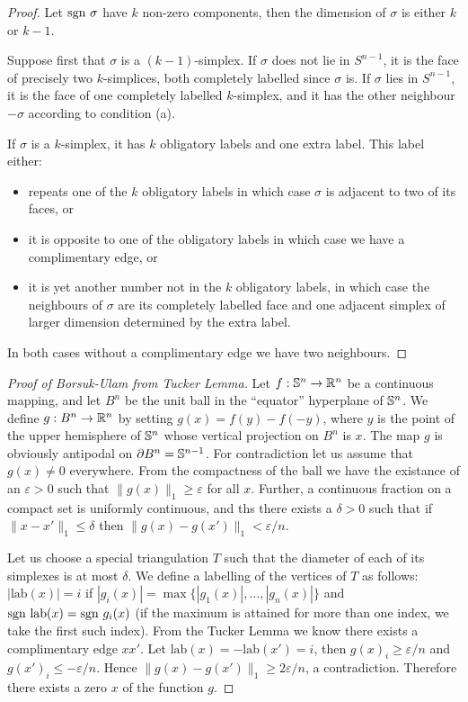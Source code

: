 \begin{proof}
    Let $\text{sgn } \sigma$ have $k$ non-zero components, then the dimension of $\sigma$ is either $k$ or $k-1$. 

    Suppose first that $\sigma$ is a $(k-1)$-simplex. If $\sigma$ does not lie in $S^{n-1}$, it is the face of precisely two $k$-simplices, both completely labelled since $\sigma$ is.  If $\sigma$ lies in $S^{n-1}$, it is the face of one completely labelled $k$-simplex, and it has the other neighbour $-\sigma$ according to condition (a).

    If $\sigma$ is a $k$-simplex, it has $k$ obligatory labels and one extra label. This label either:
    \begin{itemize}
        \item repeats one of the $k$ obligatory labels in which case $\sigma$ is adjacent to two of its faces, or
        \item it is opposite to one of the obligatory labels in which case we have a complimentary edge, or \item it is yet another number not in the $k$ obligatory labels, in which case the neighbours of $\sigma$ are its completely labelled face and one adjacent simplex of larger dimension determined by the extra label. 
    \end{itemize}
    In both cases without a complimentary edge we have two neighbours.
\end{proof}

\begin{proof}[Proof of Borsuk-Ulam from Tucker Lemma]
    Let $f: \mathbb S^n \to \mathbb R^n$ be a continuous mapping, and let $B^n$ be the unit ball in the ``equator'' hyperplane of $\mathbb S^n$. We define $g: B^n \to \mathbb R^n$ by setting $g(x) = f(y) - f(-y)$, where $y$ is the point of the upper hemisphere of $\mathbb S^n$ whose vertical projection on $B^n$ is $x$. The map $g$ is obviously antipodal on $\partial B^n = \mathbb S^{n-1}$. For contradiction let us assume that $g(x) \neq 0$ everywhere. From the compactness of the ball we have the existance of an $\varepsilon > 0$ such that $\|g(x)\|_1 \geq \varepsilon$ for all $x$. Further, a continuous fraction on a compact set is uniformly continuous, and ths there exists a $\delta > 0$ such that if $\| x - x' \|_1 \leq \delta$ then $\|g(x) - g(x')\|_1 < \varepsilon/n$.
    
    Let us choose a special triangulation $T$ such that the diameter of each of its simplexes is at most $\delta$. We define a labelling of the vertices of $T$ as follows: $|\text{lab}(x)| = i$ if $|g_i(x)| = \max \{|g_1(x)|, \dots, |g_n(x)| \}$ and $\text{sgn } \text{lab} (x) = \text{sgn } g_i(x)$ (if the maximum is attained for more than one index, we take the first such index). From the Tucker Lemma we know there exists a complimentary edge $xx'$. Let $\text{lab}(x) = -\text{lab}(x') = i$, then $g(x)_i \geq \varepsilon/n$ and $g(x')_i \leq -\varepsilon/n$. Hence $\|g(x) - g(x') \|_1 \geq 2\varepsilon / n$, a contradiction. Therefore there exists a zero $x$ of the function $g$.
\end{proof}